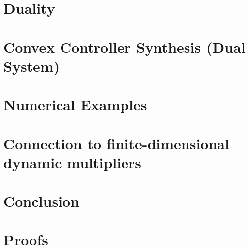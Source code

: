 \documentclass[journal,10pt,twocolumn,twoside, a4paper]{IEEEtran}
\begin{document}
\section{Duality}\label{sec:duality}\label{sec:dynamic-filtering-duality}


\section{Convex Controller Synthesis (Dual System)}\label{sec:dual-controller-synthesis}
\dualsystemcomponents


\section{Numerical Examples}


\section{Connection to finite-dimensional dynamic multipliers}
\label{sec:finite-dimensional-dynamic-multipliers}


\section{Conclusion}\label{sec:conclusion}




\onecolumn
\appendices
\renewcommand{\thesubsection}{\thesection.\arabic{subsection}}
\section{Proofs}





\vspace{12pt}
\end{document}
